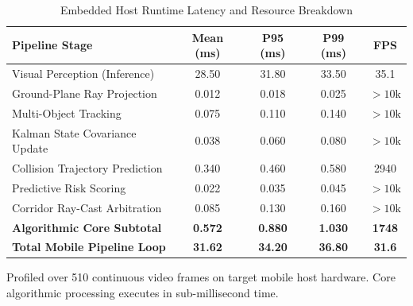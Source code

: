 \begin{table}[t]
\caption{Embedded Host Runtime Latency and Resource Breakdown}
\label{tab:runtime_profile}
\centering
\footnotesize
\setlength{\tabcolsep}{3pt}
\begin{tabularx}{\columnwidth}{Xcccc}
\toprule
\textbf{Pipeline Stage} & \textbf{Mean (ms)} & \textbf{P95 (ms)} & \textbf{P99 (ms)} & \textbf{FPS} \\
\midrule
Visual Perception (Inference) & 28.50 & 31.80 & 33.50 & 35.1 \\
Ground-Plane Ray Projection & 0.012 & 0.018 & 0.025 & $>10\text{k}$ \\
Multi-Object Tracking & 0.075 & 0.110 & 0.140 & $>10\text{k}$ \\
Kalman State Covariance Update & 0.038 & 0.060 & 0.080 & $>10\text{k}$ \\
Collision Trajectory Prediction & 0.340 & 0.460 & 0.580 & 2940 \\
Predictive Risk Scoring & 0.022 & 0.035 & 0.045 & $>10\text{k}$ \\
Corridor Ray-Cast Arbitration & 0.085 & 0.130 & 0.160 & $>10\text{k}$ \\
\midrule
\textbf{Algorithmic Core Subtotal} & \textbf{0.572} & \textbf{0.880} & \textbf{1.030} & \textbf{1748} \\
\textbf{Total Mobile Pipeline Loop} & \textbf{31.62} & \textbf{34.20} & \textbf{36.80} & \textbf{31.6} \\
\bottomrule
\end{tabularx}
\vspace{0.04cm}
\par{\raggedright \scriptsize Profiled over 510 continuous video frames on target mobile host hardware. Core algorithmic processing executes in sub-millisecond time.\par}
\end{table}

